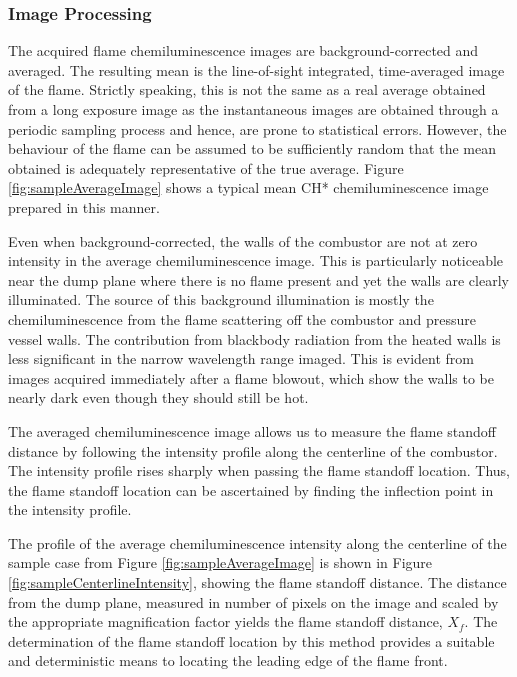 \subsubsection{Image Processing}
\label{subsubsec:chemiluminescence-image-processing}



The acquired flame chemiluminescence images are background-corrected and averaged.
The resulting mean is the line-of-sight integrated, time-averaged image of the flame.
Strictly speaking, this is not the same as a real average obtained from a long exposure image as the instantaneous images are obtained through a periodic sampling process and hence, are prone to statistical errors.
However, the behaviour of the flame can be assumed to be sufficiently random that the mean obtained is adequately representative of the true average.
Figure \ref{fig:sampleAverageImage} shows a typical mean CH* chemiluminescence image prepared in this manner.

Even when background-corrected, the walls of the combustor are not at zero intensity in the average chemiluminescence image.
This is particularly noticeable near the dump plane where there is no flame present and yet the walls are clearly illuminated.
The source of this background illumination is mostly the chemiluminescence from the flame scattering off the combustor and pressure vessel walls.
The contribution from blackbody radiation from the heated walls is less significant in the narrow wavelength range imaged.
This is evident from images acquired immediately after a flame blowout, which show the walls to be nearly dark even though they should still be hot.

The averaged chemiluminescence image allows us to measure the flame standoff distance by following the intensity profile along the centerline of the combustor.
The intensity profile rises sharply when passing the flame standoff location.
Thus, the flame standoff location can be ascertained by finding the inflection point in the intensity profile.

The profile of the average chemiluminescence intensity along the centerline of the sample case from Figure \ref{fig:sampleAverageImage} is shown in Figure \ref{fig:sampleCenterlineIntensity}, showing the flame standoff distance.
The distance from the dump plane, measured in number of pixels on the image and scaled by the appropriate magnification factor yields the flame standoff distance, \(X_f\).
The determination of the flame standoff location by this method provides a suitable and deterministic means to locating the leading edge of the flame front.

